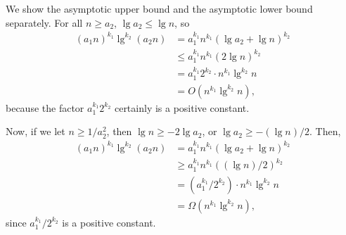 
\noindent We show the asymptotic upper bound and the asymptotic lower bound separately.
For all $n\ge a_2$, $\lg a_2\le\lg n$, so
\begin{align*}
    (a_1n)^{k_1}\lg^{k_2}(a_2n) &= a_1^{k_1}n^{k_1}(\lg a_2+\lg n)^{k_2} \\
    &\le a_1^{k_1}n^{k_1}(2\lg n)^{k_2} \\
    &= a_1^{k_1}2^{k_2}\cdot n^{k_1}\lg^{k_2}n \\
    &= O(n^{k_1}\lg^{k_2}n),
\end{align*}
because the factor $a_1^{k_1}2^{k_2}$ certainly is a positive constant.

Now, if we let $n\ge1/a_2^2$, then $\lg n\ge-2\lg a_2$, or $\lg a_2\ge-(\lg n)/2$.
Then,
\begin{align*}
    (a_1n)^{k_1}\lg^{k_2}(a_2n) &= a_1^{k_1}n^{k_1}(\lg a_2+\lg n)^{k_2} \\
    &\ge a_1^{k_1}n^{k_1}((\lg n)/2)^{k_2} \\
    &= (a_1^{k_1}\!/2^{k_2})\cdot n^{k_1}\lg^{k_2}n \\
    &= \Omega(n^{k_1}\lg^{k_2}n),
\end{align*}
since $a_1^{k_1}\!/2^{k_2}$ is a positive constant.
